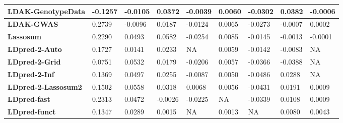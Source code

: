 \documentclass[pdflatex,sn-basic]{sn-jnl}
\begin{document}
\begin{table}[!ht]
{\begin{tabular}{|l|l|l|l|l|l|l|l|l|}
\hline
\textbf{LDAK-GenotypeData} & \cellcolor[HTML]{FA9C74}-0.1257 & \cellcolor[HTML]{F98D72}-0.0105 & \cellcolor[HTML]{F0E784}0.0372 & \cellcolor[HTML]{F9EA84}-0.0039 & \cellcolor[HTML]{FFEB84}0.0060 & \cellcolor[HTML]{FEDE81}-0.0302 & \cellcolor[HTML]{C6DB81}0.0382 & \cellcolor[HTML]{FEE582}-0.0006 \\
\hline
\textbf{LDAK-GWAS} & \cellcolor[HTML]{63BE7B}0.2739 & \cellcolor[HTML]{FA8F72}-0.0096 & \cellcolor[HTML]{FDD780}0.0187 & \cellcolor[HTML]{FDD17F}-0.0124 & \cellcolor[HTML]{FEEB84}0.0065 & \cellcolor[HTML]{FEE482}-0.0273 & \cellcolor[HTML]{FED880}-0.0007 & \cellcolor[HTML]{FFEB84}0.0002 \\
\hline
\textbf{Lassosum} & \cellcolor[HTML]{87C97E}0.2290 & \cellcolor[HTML]{9FD07F}0.0493 & \cellcolor[HTML]{C8DC81}0.0582 & \cellcolor[HTML]{FBA175}-0.0254 & \cellcolor[HTML]{FAEA84}0.0085 & \cellcolor[HTML]{E6E483}-0.0145 & \cellcolor[HTML]{FDD780}-0.0013 & \cellcolor[HTML]{FEE983}-0.0001 \\
\hline
\textbf{LDpred-2-Auto} & \cellcolor[HTML]{B4D680}0.1727 & \cellcolor[HTML]{FCC57C}0.0141 & \cellcolor[HTML]{FEE081}0.0233 & NA& \cellcolor[HTML]{FEEA83}0.0059 & \cellcolor[HTML]{E6E483}-0.0142 & \cellcolor[HTML]{FDC87D}-0.0083 & NA\\
\hline
\textbf{LDpred-2-Grid} & \cellcolor[HTML]{FEE983}0.0751 & \cellcolor[HTML]{8ACA7E}0.0532 & \cellcolor[HTML]{FDD67F}0.0179 & \cellcolor[HTML]{FCB379}-0.0206 & \cellcolor[HTML]{FEEA83}0.0057 & \cellcolor[HTML]{FDD07E}-0.0366 & \cellcolor[HTML]{F98871}-0.0388 & NA\\
\hline
\textbf{LDpred-2-Inf} & \cellcolor[HTML]{D1DE82}0.1369 & \cellcolor[HTML]{9DCF7F}0.0497 & \cellcolor[HTML]{FEE482}0.0255 & \cellcolor[HTML]{FEDF81}-0.0087 & \cellcolor[HTML]{FEEA83}0.0050 & \cellcolor[HTML]{FCB579}-0.0486 & \cellcolor[HTML]{D8E082}0.0288 & NA\\
\hline
\textbf{LDpred-2-Lassosum2} & \cellcolor[HTML]{C6DB81}0.1502 & \cellcolor[HTML]{7DC67D}0.0558 & \cellcolor[HTML]{FAEA84}0.0318 & \cellcolor[HTML]{D4DF82}0.0068 & \cellcolor[HTML]{FEEA83}0.0056 & \cellcolor[HTML]{FCC27C}-0.0431 & \cellcolor[HTML]{EBE583}0.0191 & \cellcolor[HTML]{FEEB84}0.0009 \\
\hline
\textbf{LDpred-fast} & \cellcolor[HTML]{86C87D}0.2313 & \cellcolor[HTML]{AAD380}0.0472 & \cellcolor[HTML]{FBAE78}-0.0026 & \cellcolor[HTML]{FBAC77}-0.0225 & NA& \cellcolor[HTML]{FDD680}-0.0339 & \cellcolor[HTML]{FAEA84}0.0108 & \cellcolor[HTML]{FEEB84}0.0009 \\
\hline
\textbf{LDpred-funct} & \cellcolor[HTML]{D3DF82}0.1347 & \cellcolor[HTML]{FEE783}0.0289 & \cellcolor[HTML]{FCB679}0.0015 & NA& \cellcolor[HTML]{FEE883}0.0013 & NA& \cellcolor[HTML]{FFEB84}0.0080 & \cellcolor[HTML]{F5E884}0.0043 \\

\end{tabular}}
\end{table}
\end{document}
